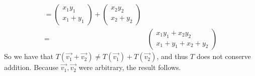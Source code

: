 \documentclass[12pt]{article}
\newenvironment{problem}[2][Problem]
{
	\begin{trivlist} 
		\item[\hskip \labelsep {\bfseries #1 #2:}]
	}
{
	\end{trivlist}
	}
\newenvironment{solution}[1][Solution]
{
	\begin{trivlist} 
		\item[\hskip \labelsep {\itshape #1:}]
	}
	{
	\end{trivlist}
}
\begin{document}
\begin{problem}{1}
\begin{solution}
\begin{align*}
=\begin{pmatrix} x_{1}y_{1} \\ x_{1} + y_{1} \end{pmatrix} + \begin{pmatrix} x_{2}y_{2} \\ x_{2} + y_{2} \end{pmatrix}\\
=& \begin{pmatrix} x_{1}y_{1} + x_{2}y_{2} \\ x_{1} + y_{1} + x_{2} + y_{2} \end{pmatrix}
\end{align*}
So we have that $T \left( \vec{v_{1}} + \vec{v_{2}} \right) \neq T \left( \vec{v_{1}} \right) +T \left( \vec{v_{2}} \right)$, and thus $T$ does not conserve addition. Because $\vec{v_{1}}, \vec{v_{2}}$ were arbitrary, the result follows.
\end{solution}


\end{problem}
\end{document}

